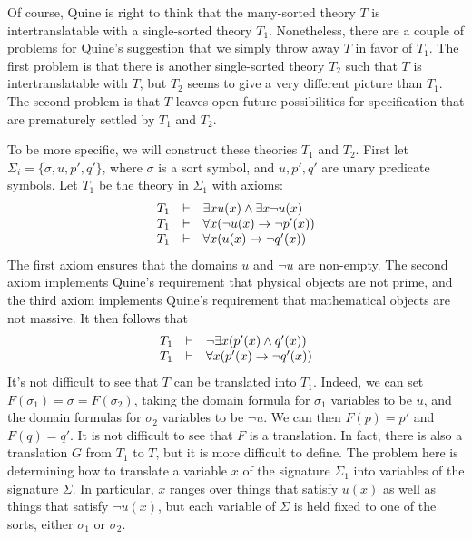 \begin{example}
  Of course, Quine is right to think that the many-sorted theory $T$
  is intertranslatable with a single-sorted theory $T_1$.
  Nonetheless, there are a couple of problems for Quine's suggestion
  that we simply throw away $T$ in favor of $T_1$.  The first problem
  is that there is another single-sorted theory $T_2$ such that $T$ is
  intertranslatable with $T$, but $T_2$ seems to give a very different
  picture than $T_1$.  The second problem is that $T$ leaves open
  future possibilities for specification that are prematurely settled
  by $T_1$ and $T_2$.

  To be more specific, we will construct these theories $T_1$ and
  $T_2$.  First let $\Sigma _i=\{ \sigma ,u,p',q' \}$, where $\sigma$
  is a sort symbol, and $u,p',q'$ are unary predicate symbols.  Let
  $T_1$ be the theory in $\Sigma _1$ with axioms:
  \[ \begin{array}{l l l}
       T_1 & \vdash & \exists xu(x)\wedge\exists x\neg u(x) \\
       T_1 & \vdash & \forall x(\neg u(x)\to \neg p'(x)) \\
       T_1 &\vdash & \forall x(u(x)\to \neg q'(x)) \end{array} \]
   The first axiom ensures that the domains $u$ and $\neg u$ are
   non-empty.  The second axiom implements Quine's requirement that
   physical objects are not prime, and the third axiom implements
   Quine's requirement that mathematical objects are not massive.  It
   then follows that
   \[ \begin{array}{l l l} T_1 & \vdash & \neg \exists x(p'(x)\wedge
                                          q'(x)) \\
        T_1 & \vdash & \forall x(p'(x)\to \neg q'(x)) \end{array} \]
It's not difficult to see that $T$ can be translated into $T_1$.
Indeed, we can set $F(\sigma _1)=\sigma =F(\sigma _2)$, taking the
domain formula for $\sigma _1$ variables to be $u$, and the domain
formulas for $\sigma _2$ variables to be $\neg u$.  We can then
$F(p)=p'$ and $F(q)=q'$.  It is not difficult to see that $F$ is a
translation.  In fact, there is also a translation $G$ from $T_1$ to
$T$, but it is more difficult to define.  The problem here is
determining how to translate a variable $x$ of the signature $\Sigma
_1$ into variables of the signature $\Sigma$.  In particular, $x$
ranges over things that satisfy $u(x)$ as well as things that satisfy
$\neg u(x)$, but each variable of $\Sigma$ is held fixed to one of the
sorts, either $\sigma _1$ or $\sigma _2$.


\end{example}
